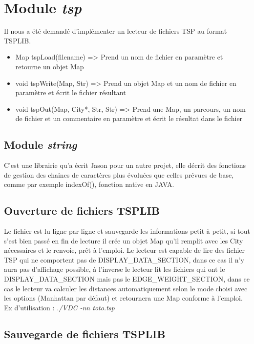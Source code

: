 \documentclass[12pt]{report}
\begin{document}
{{{{{{{%
\section{Module \textit{tsp}}

Il nous a été demandé d'implémenter un lecteur de fichiers TSP au format TSPLIB.

\begin{itemize}
\item Map tspLoad(filename) => Prend un nom de fichier en paramètre et retourne un objet Map
\item void tspWrite(Map, Str) => Prend un objet Map et un nom de fichier en paramètre et écrit le fichier résultant
\item void tspOut(Map, City*, Str, Str) => Prend une Map, un parcours, un nom de fichier et un commentaire en paramètre et écrit le résultat dans le fichier
\end{itemize}

\subsection{Module \textit{string}}

C'est une librairie qu'a écrit Jason pour un autre projet, elle décrit des fonctions de gestion des chaines de caractères plus évoluées que celles prévues de base, comme par exemple indexOf(), fonction native en JAVA.

\subsection{Ouverture de fichiers TSPLIB}

Le fichier est lu ligne par ligne et sauvegarde les informations petit à petit, si tout s'est bien passé en fin de lecture il crée un objet Map qu'il remplit avec les City nécessaires et le renvoie, prêt à l'emploi.
Le lecteur est capable de lire des fichier TSP qui ne comportent pas de DISPLAY\_DATA\_SECTION, dans ce cas il n'y aura pas d'affichage possible, à l'inverse le lecteur lit les fichiers qui ont le DISPLAY\_DATA\_SECTION mais pas le EDGE\_WEIGHT\_SECTION, dans ce cas le lecteur va calculer les distances automatiquement selon le mode choisi avec les options (Manhattan par défaut) et retournera une Map conforme à l'emploi. Ex d'utilisation : \textit{./VDC -nn toto.tsp}

\subsection{Sauvegarde de fichiers TSPLIB}

}}}}}}}
\end{document}
